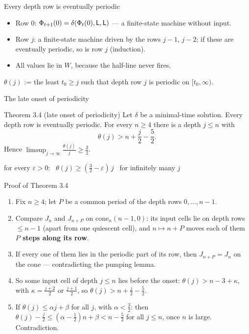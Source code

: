 \begin{frame}{Every depth row is eventually periodic}
\begin{itemize}
\item Row $0$: $\Phi_{t+1}(0)=\delta(\Phi_t(0),\mathsf L,\mathsf L)$ --- a finite-state machine without input.
\item Row $j$: a finite-state machine driven by the rows $j-1$, $j-2$; if these are eventually periodic, so is row $j$ (induction).
\item All values lie in $W$, because the half-line never fires.
\end{itemize}
\vspace{1ex}
\begin{plainbox}
$\theta(j)$ := the least $t_0\ge j$ such that depth row $j$ is periodic on $[t_0,\infty)$.
\end{plainbox}
\end{frame}

\begin{frame}{The late onset of periodicity}
\begin{statement}{Theorem 3.4 (late onset of periodicity)}
Let $\delta$ be a minimal-time solution. Every depth row is eventually periodic. For every $n\ge4$ there is a depth $j\le n$ with
\[\theta(j)>n+\frac j2-\frac52 .\]
Hence $\displaystyle\limsup_{j\to\infty}\frac{\theta(j)}{j}\ge\frac32$.
\end{statement}
\vspace{1ex}
\begin{center}for every $\varepsilon>0$: \ $\theta(j)\ge(\tfrac32-\varepsilon)\,j$ \ for infinitely many $j$\end{center}
\end{frame}

\begin{frame}{Proof of Theorem 3.4}
\begin{enumerate}
\item Fix $n\ge4$; let $P$ be a common period of the depth rows $0,\dots,n-1$.
\item Compare $J_n$ and $J_{n+P}$ on $\mathrm{cone}_n(n-1,0)$: its input cells lie on depth rows $\le n-1$ (apart from one quiescent cell), and $n\mapsto n+P$ moves each of them \textbf{$P$ steps along its row}.
\item<2-> If every one of them lies in the periodic part of its row, then $J_{n+P}=J_n$ on the cone --- contradicting the pumping lemma.
\item<2-> So some input cell of depth $j\le n$ lies before the onset: $\theta(j)>n-3+\kappa$, with $\kappa=\frac{j+2}2$ or $\frac{j+1}2$, so $\theta(j)>n+\frac j2-\frac52$.
\item<3-> If $\theta(j)\le\alpha j+\beta$ for all $j$, with $\alpha<\frac32$: then $\theta(j)-\frac j2\le(\alpha-\frac12)n+\beta<n-\frac52$ for all $j\le n$, once $n$ is large. Contradiction.
\end{enumerate}
\end{frame}

